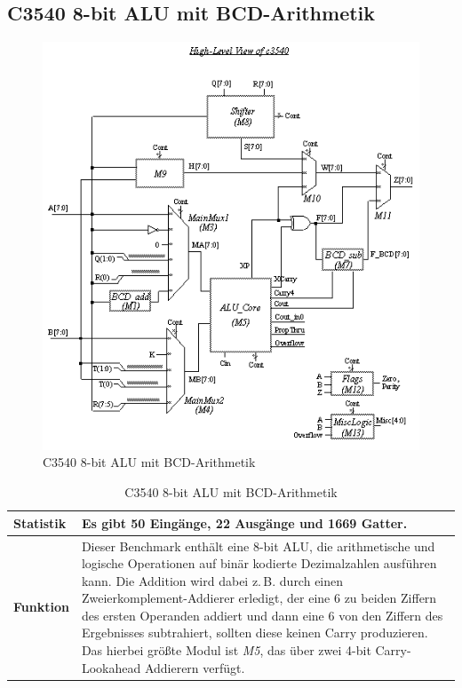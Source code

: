 \subsection*{C3540 8-bit ALU mit BCD-Arithmetik}
\label{sec:c3540}
\begin{figure}[bth]
	\centering
	\includegraphics[scale=0.6]{./img/c3540}
	\caption[C3540 8-bit ALU mit BCD-Arithmetik]{C3540 8-bit ALU mit BCD-Arithmetik \cite{h1999}}
	\label{fig:c3540}
\end{figure}
\begin{table}[bth]
	\centering
	\caption{C3540 8-bit ALU mit BCD-Arithmetik}
	\label{tab:c3540}
	\begin{tabular}{ | p{2cm} | p{12cm} |}
		\hline
		\textbf{Statistik} & Es gibt 50 Eingänge, 22 Ausgänge und 1669 Gatter. \\\hline
		\textbf{Funktion} & Dieser Benchmark enthält eine 8-bit ALU, die arithmetische und logische Operationen auf binär kodierte Dezimalzahlen ausführen kann. Die Addition wird dabei z.\,B. durch einen Zweierkomplement-Addierer erledigt, der eine $6$ zu beiden Ziffern des ersten Operanden addiert und dann eine $6$ von den Ziffern des Ergebnisses subtrahiert, sollten diese keinen Carry produzieren. Das hierbei größte Modul ist \emph{M5}, das über zwei 4-bit Carry-Lookahead Addierern verfügt. \\\hline
	\end{tabular}
\end{table}
\newpage
